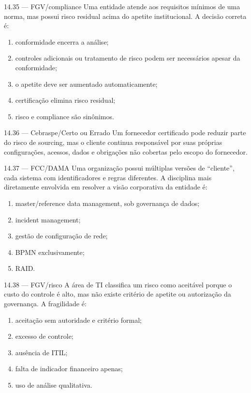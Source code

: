 \begin{questao}{ 14.35 — FGV/compliance}
Uma entidade atende aos requisitos mínimos de uma norma, mas possui risco residual acima do apetite institucional. A decisão correta é:
\begin{enumerate}[label=\Alph*)]
\item conformidade encerra a análise;
\item controles adicionais ou tratamento de risco podem ser necessários apesar da conformidade;
\item o apetite deve ser aumentado automaticamente;
\item certificação elimina risco residual;
\item risco e compliance são sinônimos.
\end{enumerate}
\end{questao}

\begin{questao}{ 14.36 — Cebraspe/Certo ou Errado}
Um fornecedor certificado pode reduzir parte do risco de sourcing, mas o cliente continua responsável por suas próprias configurações, acessos, dados e obrigações não cobertas pelo escopo do fornecedor.
\end{questao}

\begin{questao}{ 14.37 — FCC/DAMA}
Uma organização possui múltiplas versões de ``cliente'', cada sistema com identificadores e regras diferentes. A disciplina mais diretamente envolvida em resolver a visão corporativa da entidade é:
\begin{enumerate}[label=\Alph*)]
\item master/reference data management, sob governança de dados;
\item incident management;
\item gestão de configuração de rede;
\item BPMN exclusivamente;
\item RAID.
\end{enumerate}
\end{questao}

\begin{questao}{ 14.38 — FGV/risco}
A área de TI classifica um risco como aceitável porque o custo do controle é alto, mas não existe critério de apetite ou autorização da governança. A fragilidade é:
\begin{enumerate}[label=\Alph*)]
\item aceitação sem autoridade e critério formal;
\item excesso de controle;
\item ausência de ITIL;
\item falta de indicador financeiro apenas;
\item uso de análise qualitativa.
\end{enumerate}
\end{questao}

